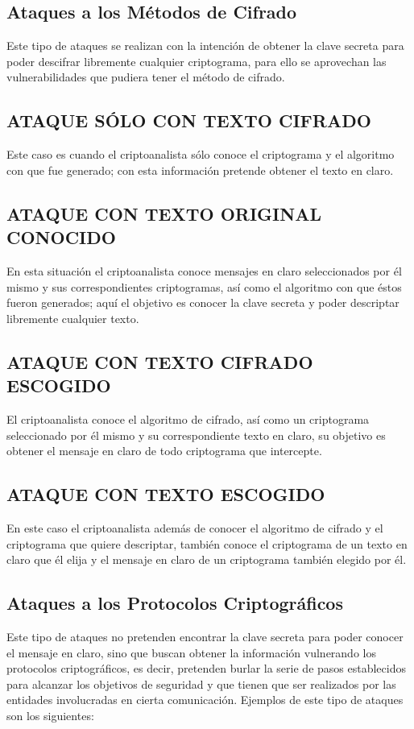 \subsection{Ataques a los Métodos de Cifrado}
Este tipo de ataques se realizan con la intención de obtener la clave secreta para poder descifrar libremente cualquier criptograma, para ello se aprovechan las vulnerabilidades que pudiera tener el método de cifrado.

\subsection{ATAQUE SÓLO CON TEXTO CIFRADO}
Este caso es cuando el criptoanalista sólo conoce el criptograma y el algoritmo con que fue generado; con esta información pretende obtener el texto en claro.

\subsection{ATAQUE CON TEXTO ORIGINAL CONOCIDO}
En esta situación el criptoanalista conoce mensajes en claro seleccionados por él mismo y sus correspondientes criptogramas, así como el algoritmo con que éstos fueron generados; aquí el objetivo es conocer la clave secreta y poder descriptar libremente cualquier texto.

\subsection{ATAQUE CON TEXTO CIFRADO ESCOGIDO}
El criptoanalista conoce el algoritmo de cifrado, así como un criptograma seleccionado por él mismo y su correspondiente texto en claro, su objetivo es obtener el mensaje en claro de todo criptograma que intercepte.

\subsection{ATAQUE CON TEXTO ESCOGIDO}
En este caso el criptoanalista además de conocer el algoritmo de cifrado y el criptograma que quiere descriptar, también conoce el criptograma de un texto en claro que él elija y el mensaje en claro de un criptograma también elegido por él.

\subsection{Ataques a los Protocolos Criptográficos}
Este tipo de ataques no pretenden encontrar la clave secreta para poder conocer el mensaje en claro, sino que buscan obtener la información vulnerando los protocolos criptográficos, es decir, pretenden burlar la serie de pasos establecidos para alcanzar los objetivos de seguridad y que tienen que ser realizados por las entidades involucradas en cierta comunicación. Ejemplos de este tipo de ataques son los siguientes:

